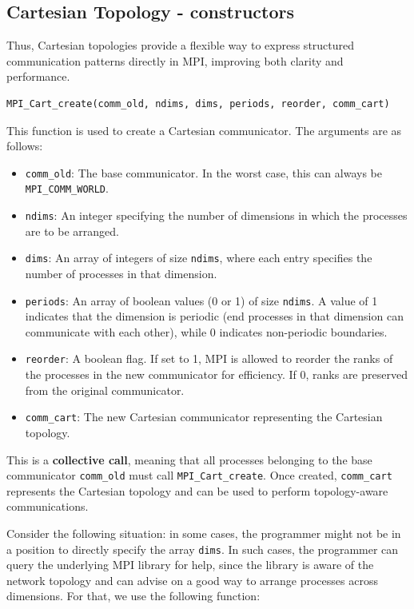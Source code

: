 \documentclass[12pt]{book}
\begin{document}
\subsection{Cartesian Topology - constructors}
Thus, Cartesian topologies provide a flexible way to express structured communication patterns directly in MPI, improving both clarity and performance.

\begin{lstlisting}[style=cppstyle]
MPI_Cart_create(comm_old, ndims, dims, periods, reorder, comm_cart)
\end{lstlisting}

This function is used to create a Cartesian communicator. The arguments are as follows:
\begin{itemize}
    \item \texttt{comm\_old}: The base communicator. In the worst case, this can always be \texttt{MPI\_COMM\_WORLD}.
    \item \texttt{ndims}: An integer specifying the number of dimensions in which the processes are to be arranged.
    \item \texttt{dims}: An array of integers of size \texttt{ndims}, where each entry specifies the number of processes in that dimension.
    \item \texttt{periods}: An array of boolean values (0 or 1) of size \texttt{ndims}. A value of 1 indicates that the dimension is periodic (end processes in that dimension can communicate with each other), while 0 indicates non-periodic boundaries.
    \item \texttt{reorder}: A boolean flag. If set to 1, MPI is allowed to reorder the ranks of the processes in the new communicator for efficiency. If 0, ranks are preserved from the original communicator.
    \item \texttt{comm\_cart}: The new Cartesian communicator representing the Cartesian topology.
\end{itemize}

\noindent
This is a \textbf{collective call}, meaning that all processes belonging to the base communicator \texttt{comm\_old} must call \texttt{MPI\_Cart\_create}. Once created, \texttt{comm\_cart} represents the Cartesian topology and can be used to perform topology-aware communications.

Consider the following situation: in some cases, the programmer might not be in a position to directly specify the array \texttt{dims}. In such cases, the programmer can query the underlying MPI library for help, since the library is aware of the network topology and can advise on a good way to arrange processes across dimensions. For that, we use the following function:
\end{document}

